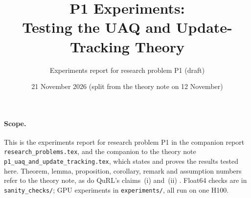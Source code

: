 \documentclass[11pt]{article}
\title{P1 Experiments:\\Testing the UAQ and Update-Tracking Theory}
\author{Experiments report for research problem P1 (draft)}
\date{21 November 2026 (split from the theory note on 12 November)}
\begin{document}
\maketitle

\paragraph{Scope.} This is the experiments report for research problem P1 in the companion report \texttt{research\_problems.tex}, and the companion to the theory note \texttt{p1\_uaq\_and\_update\_tracking.tex}, which states and proves the results tested here. Theorem, lemma, proposition, corollary, remark and assumption numbers refer to the theory note, as do QuRL's claims~(i) and~(ii) \citep{li2026qurl}. Float64 checks are in \texttt{sanity\_checks/}; GPU experiments in \texttt{experiments/}, all run on one H100.
\end{document}
